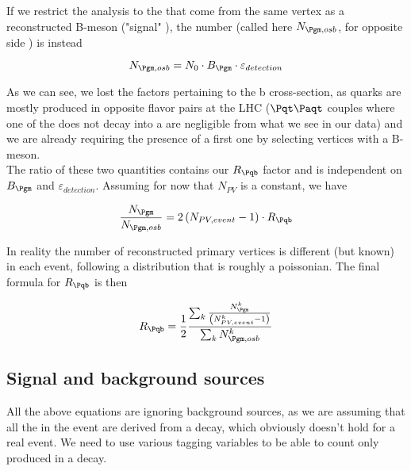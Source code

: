 If we restrict the analysis to the \Pgm that come from the same vertex as a reconstructed B-meson ("signal" \Pgm), the number (called here $N_{\Pgm, osb}$, for opposite side \Pqb) is instead

\begin{equation}
	N_{\Pgm, osb}=N_{0}\cdot B_{\Pgm}\cdot\varepsilon_{detection}
	\label{eq:xsec-sig}
\end{equation}

As we can see, we lost the factors pertaining to the b cross-section, as \Pqb quarks are mostly produced in opposite flavor pairs at the LHC ($\Pqt\Paqt$ couples where one of the \Pqt does not decay into a \Pqb are negligible from what we see in our data) and we are already requiring the presence of a first one by selecting vertices with a B-meson.\\

The ratio of these two quantities contains our $R_{\Pqb}$ factor and is independent on $B_{\Pgm}$ and $\varepsilon_{detection}$. 
Assuming for now that $N_{PV}$ is a constant, we have

\begin{equation}
	\frac{N_{\Pgm}}{N_{\Pgm, osb}}=2\left(N_{PV, event} - 1\right)\cdot R_{\Pqb}
	\label{eq:raw_ratio}
\end{equation}

In reality the number of reconstructed primary vertices is different (but known) in each event, following a distribution that is roughly a poissonian. 
The final formula for $R_{\Pqb}$ is then

\begin{equation}
	R_{\Pqb}=\frac{1}{2}\frac{\sum_{k}\frac{N^k_{\Pgm}}{\left(N^k_{PV, event} - 1\right)}}{\sum_{k}N^k_{\Pgm, osb}}
	\label{eq:final_method}
\end{equation}

\subsection{Signal and background sources}
\label{subsec:sig_bkg}

All the above equations are ignoring background sources, as we are assuming that all the \Pgm in the event are derived from a \Pqb decay, which obviously doesn't hold for a real event.
We need to use various tagging variables to be able to count only \Pgm produced in a \Pqb decay.


